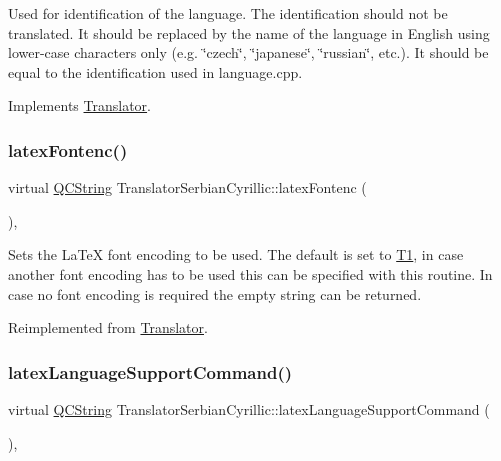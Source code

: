 Used for identification of the language. The identification should not be translated. It should be replaced by the name of the language in English using lower-\/case characters only (e.\+g. \char`\"{}czech\char`\"{}, \char`\"{}japanese\char`\"{}, \char`\"{}russian\char`\"{}, etc.). It should be equal to the identification used in language.\+cpp. 

Implements \mbox{\hyperlink{class_translator}{Translator}}.

\mbox{\label{class_translator_serbian_cyrillic_a6c20ea532f61ab33968dbb951299fc6b}} 
\subsubsection{\texorpdfstring{latexFontenc()}{latexFontenc()}}
{\footnotesize\ttfamily virtual \mbox{\hyperlink{class_q_c_string}{Q\+C\+String}} Translator\+Serbian\+Cyrillic\+::latex\+Fontenc (\begin{DoxyParamCaption}{ }\end{DoxyParamCaption})\hspace{0.3cm}{\ttfamily [inline]}, {\ttfamily [virtual]}}

Sets the La\+TeX font encoding to be used. The default is set to {\ttfamily \mbox{\hyperlink{class_t1}{T1}}}, in case another font encoding has to be used this can be specified with this routine. In case no font encoding is required the empty string can be returned. 

Reimplemented from \mbox{\hyperlink{class_translator_a573b483369d8d7cf7d85831a9da356be}{Translator}}.

\mbox{\label{class_translator_serbian_cyrillic_a68646868262f568aa5d23fa4fd094a15}} 
\subsubsection{\texorpdfstring{latexLanguageSupportCommand()}{latexLanguageSupportCommand()}}
{\footnotesize\ttfamily virtual \mbox{\hyperlink{class_q_c_string}{Q\+C\+String}} Translator\+Serbian\+Cyrillic\+::latex\+Language\+Support\+Command (\begin{DoxyParamCaption}{ }\end{DoxyParamCaption})\hspace{0.3cm}{\ttfamily [inline]}, {\ttfamily [virtual]}}

